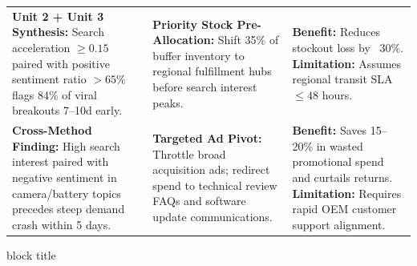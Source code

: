 \documentclass[aspectratio=169, 10pt]{beamer}
\newenvironment{highlightcard}[1][]{%
        \begin{beamercolorbox}[rounded=true,shadow=false,wd=\linewidth,sep=3.5pt,#1]{block title}%
        \fontsize{7.8pt}{9.8pt}\selectfont%
    }{%
        \end{beamercolorbox}%
    }
\begin{document}
\begin{frame}[t]
\begin{table}[h]
\begin{tabular}{p{3.8cm}p{4.5cm}p{4.5cm}}
                \textbf{Unit 2 + Unit 3 Synthesis:} \newline Search acceleration $\ge 0.15$ paired with positive sentiment ratio $> 65\%$ flags 84\% of viral breakouts 7--10d early. &                
  \textbf{Priority Stock Pre-Allocation:} Shift 35\% of buffer inventory to regional fulfillment hubs before search interest peaks. & \textbf{Benefit:} Reduces stockout loss by ~30\%. \newline       
  \textbf{Limitation:} Assumes regional transit SLA $\le 48$ hours. \\                                                                                                                                 
                \addlinespace[3pt]                                                                                                                                                                     
                \textbf{Cross-Method Finding:} \newline High search interest paired with negative sentiment in camera/battery topics precedes steep demand crash within 5 days. & \textbf{Targeted Ad  
  Pivot:} Throttle broad acquisition ads; redirect spend to technical review FAQs and software update communications. & \textbf{Benefit:} Saves 15--20\% in wasted promotional spend and curtails      
  returns. \newline \textbf{Limitation:} Requires rapid OEM customer support alignment. \\                                                                                                             
                \bottomrule                                                                                                                                                                            
            \end{tabular}                                                                                                                                                                              
        \end{table}                                                                                                                                                                                    
        \vspace{-0.15cm}                                                                                                                                                                               
        \begin{highlightcard}                                                                                                                                                                          

\end{highlightcard}
\end{frame}
\end{document}
